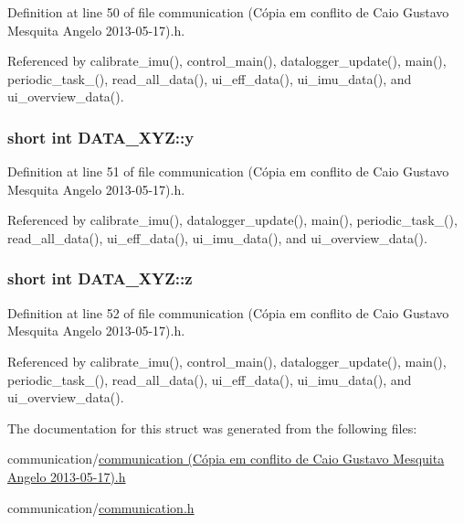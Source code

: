 Definition at line 50 of file communication (\-Cópia em conflito de Caio Gustavo Mesquita Angelo 2013-\/05-\/17).\-h.



Referenced by calibrate\-\_\-imu(), control\-\_\-main(), datalogger\-\_\-update(), main(), periodic\-\_\-task\-\_(), read\-\_\-all\-\_\-data(), ui\-\_\-eff\-\_\-data(), ui\-\_\-imu\-\_\-data(), and ui\-\_\-overview\-\_\-data().

\hypertarget{structDATA__XYZ_a94bbb1c889bf53eb6a5fffa2b39322cf}{
\subsubsection[{y}]{\setlength{\rightskip}{0pt plus 5cm}short int D\-A\-T\-A\-\_\-\-X\-Y\-Z\-::y}}\label{structDATA__XYZ_a94bbb1c889bf53eb6a5fffa2b39322cf}


Definition at line 51 of file communication (\-Cópia em conflito de Caio Gustavo Mesquita Angelo 2013-\/05-\/17).\-h.



Referenced by calibrate\-\_\-imu(), datalogger\-\_\-update(), main(), periodic\-\_\-task\-\_(), read\-\_\-all\-\_\-data(), ui\-\_\-eff\-\_\-data(), ui\-\_\-imu\-\_\-data(), and ui\-\_\-overview\-\_\-data().

\hypertarget{structDATA__XYZ_a69e89ab0ec6e5d72fc5d54f62cc07fb5}{
\subsubsection[{z}]{\setlength{\rightskip}{0pt plus 5cm}short int D\-A\-T\-A\-\_\-\-X\-Y\-Z\-::z}}\label{structDATA__XYZ_a69e89ab0ec6e5d72fc5d54f62cc07fb5}


Definition at line 52 of file communication (\-Cópia em conflito de Caio Gustavo Mesquita Angelo 2013-\/05-\/17).\-h.



Referenced by calibrate\-\_\-imu(), control\-\_\-main(), datalogger\-\_\-update(), main(), periodic\-\_\-task\-\_(), read\-\_\-all\-\_\-data(), ui\-\_\-eff\-\_\-data(), ui\-\_\-imu\-\_\-data(), and ui\-\_\-overview\-\_\-data().



The documentation for this struct was generated from the following files\-:\begin{DoxyCompactItemize}
\item 
communication/\hyperlink{communication_01_07C_xC3_xB3pia_01em_01conflito_01de_01Caio_01Gustavo_01Mesquita_01Angelo_012013-05-17_08_8h}{communication (\-Cópia em conflito de Caio Gustavo Mesquita Angelo 2013-\/05-\/17).\-h}\item 
communication/\hyperlink{communication_2communication_8h}{communication.\-h}\end{DoxyCompactItemize}
